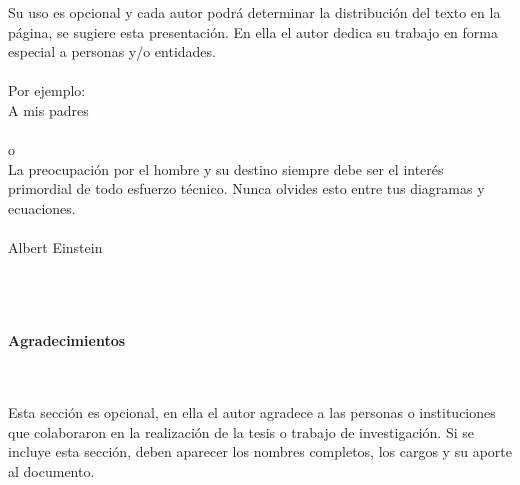 \begin{flushright}
\begin{minipage}{8cm}
    \noindent
        \small
        Su uso es opcional y cada autor podr\'{a} determinar la distribuci\'{o}n del texto en la p\'{a}gina, se sugiere esta presentaci\'{o}n. En ella el autor dedica su trabajo en forma especial a personas y/o entidades.\\[1.0cm]\\
        Por ejemplo:\\[1.0cm]
        A mis padres\\[1.0cm]\\
        o\\[1.0cm]
        La preocupaci\'{o}n por el hombre y su destino siempre debe ser el
        inter\'{e}s primordial de todo esfuerzo t\'{e}cnico. Nunca olvides esto
        entre tus diagramas y ecuaciones.\\\\
        Albert Einstein\\
\end{minipage}
\end{flushright}

\newpage{\pagestyle{empty}\cleardoublepage}

\newpage
\thispagestyle{empty} \textbf{}\normalsize
\\\\\\%
\textbf{\LARGE Agradecimientos}
\\\\
Esta secci\'{o}n es opcional, en ella el autor agradece a las personas o instituciones que colaboraron en la realizaci\'{o}n de la tesis  o trabajo de investigaci\'{o}n. Si se incluye esta secci\'{o}n, deben aparecer los nombres completos, los cargos y su aporte al documento.\\

\newpage{\pagestyle{empty}\cleardoublepage}

